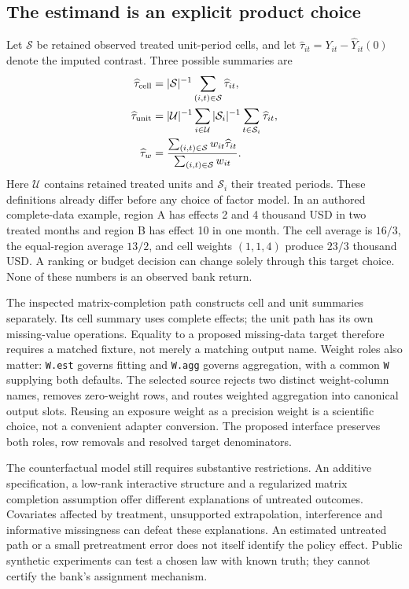 \subsection{The estimand is an explicit product choice}
Let $\mathcal S$ be retained observed treated unit-period cells, and let
$\widehat\tau_{it}=Y_{it}-\widehat Y_{it}(0)$ denote the imputed contrast.
Three possible summaries are
\begin{align}
 \widehat\tau_{\rm cell}&=|\mathcal S|^{-1}
      \sum_{(i,t)\in\mathcal S}\widehat\tau_{it},\\
 \widehat\tau_{\rm unit}&=|\mathcal U|^{-1}\sum_{i\in\mathcal U}
      |\mathcal S_i|^{-1}\sum_{t\in\mathcal S_i}\widehat\tau_{it},\\
 \widehat\tau_w&=\frac{\sum_{(i,t)\in\mathcal S}w_{it}\widehat\tau_{it}}
                       {\sum_{(i,t)\in\mathcal S}w_{it}}.
\end{align}
Here $\mathcal U$ contains retained treated units and $\mathcal S_i$ their
treated periods. These definitions already differ before any choice of
factor model. In an authored complete-data example, region A has effects
2 and 4 thousand USD in two treated months and region B has effect 10 in
one month. The cell average is $16/3$, the equal-region average $13/2$,
and cell weights $(1,1,4)$ produce $23/3$ thousand USD. A ranking or budget
decision can change solely through this target choice. None of these
numbers is an observed bank return.~\citep{exec24_fect_choice}

The inspected matrix-completion path constructs cell and unit summaries
separately. Its cell summary uses complete effects; the unit path has its
own missing-value operations. Equality to a proposed missing-data target
therefore requires a matched fixture, not merely a matching output name.
Weight roles also matter: \texttt{W.est} governs fitting and \texttt{W.agg}
governs aggregation, with a common \texttt{W} supplying both defaults.
The selected source rejects two distinct weight-column names, removes
zero-weight rows, and routes weighted aggregation into canonical output
slots. Reusing an exposure weight as a precision weight is a scientific
choice, not a convenient adapter conversion. The proposed interface
preserves both roles, row removals and resolved target denominators.
\citep{exec24_fect_source,exec21_gsynth_engine}

The counterfactual model still requires substantive restrictions. An
additive specification, a low-rank interactive structure and a regularized
matrix completion assumption offer different explanations of untreated
outcomes. Covariates affected by treatment, unsupported extrapolation,
interference and informative missingness can defeat these explanations.
An estimated untreated path or a small pretreatment error does not itself
identify the policy effect. Public synthetic experiments can test a chosen
law with known truth; they cannot certify the bank's assignment mechanism.
\citep{exec24_fect_choice}

